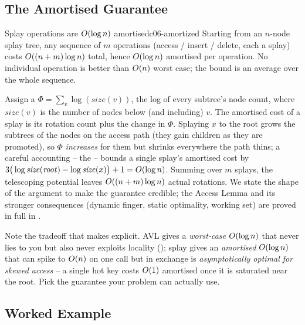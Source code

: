 \subsection{The Amortised Guarantee}

\begin{theorem}{Splay operations are $O(\log n)$ amortised}{c06-amortized}
Starting from an $n$-node splay tree, any sequence of $m$ operations (access / insert / delete, each a
splay) costs $O((n+m)\log n)$ total, hence $O(\log n)$ amortised per operation. No individual
operation is better than $O(n)$ worst case; the bound is an average over the whole sequence.
\end{theorem}
\begin{proofbox}
Assign a  $\Phi = \sum_{v} \log(\mathit{size}(v))$, the log of every subtree's node count,
where $\mathit{size}(v)$ is the number of nodes below (and including) $v$. The amortised cost of a splay is
its rotation count plus the change in $\Phi$. Splaying $x$ to the root grows the subtrees of the nodes on
the access path (they gain children as they are promoted), so $\Phi$ \emph{increases} for them but shrinks
everywhere the path thins; a careful accounting -- the  -- bounds a single splay's
amortised cost by $3\big(\log \mathit{size}(\mathit{root}) - \log \mathit{size}(x)\big) + 1 =
O(\log n)$. Summing over $m$ splays, the telescoping potential leaves $O((n+m)\log n)$ actual
rotations. We state the shape of the argument to make the guarantee credible; the Access Lemma and its
stronger consequences (dynamic finger, static optimality, working set) are proved in full in
. \end{proofbox}
\begin{insightbox}
Note the tradeoff that  makes explicit. AVL gives a \emph{worst-case}
$O(\log n)$ that never lies to you but also never exploits locality (); splay
gives an \emph{amortised} $O(\log n)$ that can spike to $O(n)$ on one call but in exchange is
\emph{asymptotically optimal for skewed access} -- a single hot key costs $O(1)$ amortised once it is
saturated near the root. Pick the guarantee your problem can actually use.
\end{insightbox}

\subsection{Worked Example}

